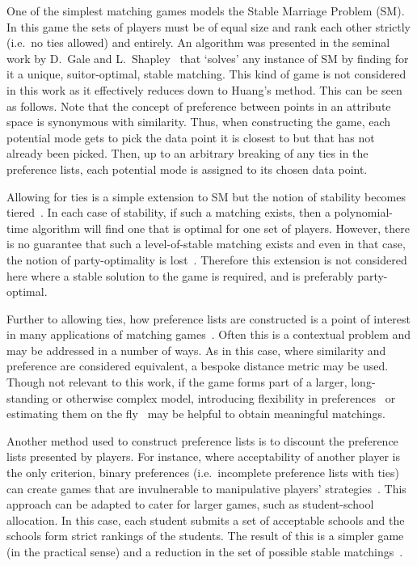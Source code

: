 One of the simplest matching games models the Stable Marriage Problem (SM). In
this game the sets of players must be of equal size and rank each other strictly
(i.e.\ no ties allowed) and entirely. An algorithm was presented in the seminal
work by D.\ Gale and L.\ Shapley~\cite{Gale1962} that `solves' any instance of
SM by finding for it a unique, suitor-optimal, stable matching. This kind of
game is not considered in this work as it effectively reduces down to Huang's
method. This can be seen as follows. Note that the concept of preference between
points in an attribute space is synonymous with similarity. Thus, when
constructing the game, each potential mode gets to pick the data point it is
closest to but that has not already been picked. Then, up to an arbitrary
breaking of any ties in the preference lists, each potential mode is assigned to
its chosen data point.

Allowing for ties is a simple extension to SM but the notion of stability
becomes tiered~\cite{Iwama2016,Iwama1999}. In each case of stability, if such a
matching exists, then a polynomial-time algorithm will find one that is optimal
for one set of players. However, there is no guarantee that such a
level-of-stable matching exists and even in that case, the notion of
party-optimality is lost~\cite{Erdil2017}. Therefore this extension is not
considered here where a stable solution to the game is required, and is
preferably party-optimal.

Further to allowing ties, how preference lists are constructed is a point of
interest in many applications of matching games~\cite{Iwama2008,Manlove2002}.
Often this is a contextual problem and may be addressed in a number of ways. As
in this case, where similarity and preference are considered equivalent, a
bespoke distance metric may be used. Though not relevant to this work, if the
game forms part of a larger, long-standing or otherwise complex model,
introducing flexibility in preferences~\cite{Agarwal2017,Menzel2015} or
estimating them on the fly~\cite{Rastegari2016} may be helpful to obtain
meaningful matchings.

Another method used to construct preference lists is to discount the preference
lists presented by players. For instance, where acceptability of another player
is the only criterion, binary preferences (i.e.\ incomplete preference lists
with ties) can create games that are invulnerable to manipulative players'
strategies~\cite{Bogomolnaia2004}. This approach can be adapted to cater for
larger games, such as student-school allocation. In this case, each student
submits a set of acceptable schools and the schools form strict rankings of the
students. The result of this is a simpler game (in the practical sense) and a
reduction in the set of possible stable
matchings~\cite{Haeringer2014,Haeringer2019}.

